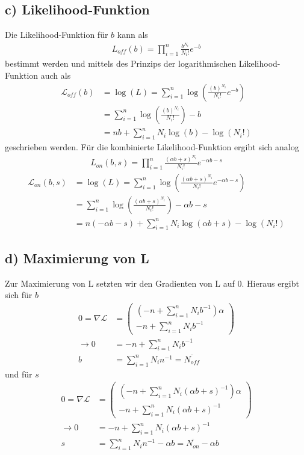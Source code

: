 \subsection*{c) Likelihood-Funktion}
\label{sub:Likelihood-Funktion}
Die Likelihood-Funktion für $b$ kann als
\begin{align}
    L_{off} (b)=\prod_{i=1}^n \frac{b^{N_i}}{{N_i}!}e^{-b}
\end{align}
bestimmt werden und mittels des Prinzips der logarithmischen Likelihood-Funktion auch als
\begin{align}
    \mathcal{L}_{off}(b)&=\log(L)=\sum_{i=1}^n \log\left(\frac{(b)^{N_i}}{{N_i}!}e^{-b}\right)\nonumber\\
                    &=\sum_{i=1}^n \log\left(\frac{(b)^{N_i}}{{N_i}!}\right)-b\nonumber\\
                    &=n b+ \sum_{i=1}^n N_i\log\left(b\right) -\log(N_i!)
\end{align}
geschrieben werden.
Für die kombinierte Likelihood-Funktion ergibt sich analog
\begin{align}
    L_{on} (b,s)=\prod_{i=1}^n \frac{(\alpha b+s)^{N_i}}{{N_i}!}e^{-\alpha b-s}
\end{align}
\begin{align}
    \mathcal{L}_{on}(b,s)&=\log(L)=\sum_{i=1}^n \log\left(\frac{(\alpha b+s)^{N_i}}{{N_i}!}e^{-\alpha b-s}\right)\nonumber\\
                    &=\sum_{i=1}^n \log\left(\frac{(\alpha b+s)^{N_i}}{{N_i}!}\right)-\alpha b-s\nonumber\\
                    &=n (-\alpha b-s)+ \sum_{i=1}^n N_i\log\left(\alpha b+s\right) -\log(N_i!)
\end{align}

\subsection*{d) Maximierung von L}
\label{sub:Maximierung von L}
Zur Maximierung von L setzten wir den Gradienten von L auf $0$. Hieraus ergibt sich für $b$
\begin{align}
    0=\nabla \mathcal{L}&=\left(\begin{matrix}
        \left(-n+\sum_{i=1}^n N_i b^{-1}\right)\alpha\\
        -n +\sum_{i=1}^n N_i b^{-1}
    \end{matrix}\right)\nonumber\\
    \rightarrow 0&=-n+\sum_{i=1}^n N_ib^{-1}\nonumber\\
                b&=\sum_{i=1}^n N_i n^{-1}=\overline{N_{off}}
\end{align}
und für $s$
\begin{align}
    0=\nabla \mathcal{L}&=\left(\begin{matrix}
        \left(-n+\sum_{i=1}^n N_i(\alpha b + s)^{-1}\right)\alpha\\
        -n +\sum_{i=1}^n N_i (\alpha b +s)^{-1}
    \end{matrix}\right)\nonumber\\
    \rightarrow 0&=-n+\sum_{i=1}^n N_i(\alpha b + s)^{-1}\nonumber\\
                s&=\sum_{i=1}^n N_i n^{-1}-\alpha b=\overline{N_{on}}-\alpha b
\end{align}